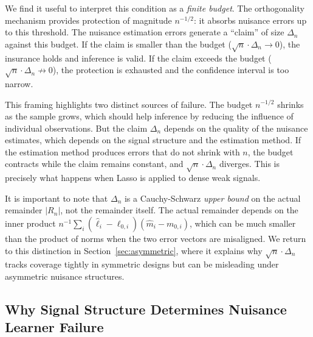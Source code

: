 \documentclass[a4paper,10.5pt]{article}
\begin{document}
We find it useful to interpret this condition as a \emph{finite budget}. The orthogonality mechanism provides protection of magnitude $n^{-1/2}$: it absorbs nuisance errors up to this threshold. The nuisance estimation errors generate a ``claim'' of size $\Delta_n$ against this budget. If the claim is smaller than the budget ($\sqrt{n} \cdot \Delta_n \to 0$), the insurance holds and inference is valid. If the claim exceeds the budget ($\sqrt{n} \cdot \Delta_n \not\to 0$), the protection is exhausted and the confidence interval is too narrow.

This framing highlights two distinct sources of failure. The budget $n^{-1/2}$ shrinks as the sample grows, which should help inference by reducing the influence of individual observations. But the claim $\Delta_n$ depends on the quality of the nuisance estimates, which depends on the signal structure and the estimation method. If the estimation method produces errors that do not shrink with $n$, the budget contracts while the claim remains constant, and $\sqrt{n} \cdot \Delta_n$ diverges. This is precisely what happens when Lasso is applied to dense weak signals.

It is important to note that $\Delta_n$ is a Cauchy-Schwarz \emph{upper bound} on the actual remainder $|R_n|$, not the remainder itself. The actual remainder depends on the inner product $n^{-1}\sum_i (\hat{\ell}_i - \ell_{0,i})(\hat{m}_i - m_{0,i})$, which can be much smaller than the product of norms when the two error vectors are misaligned. We return to this distinction in Section~\ref{sec:asymmetric}, where it explains why $\sqrt{n}\cdot\Delta_n$ tracks coverage tightly in symmetric designs but can be misleading under asymmetric nuisance structures.


\subsection{Why Signal Structure Determines Nuisance Learner Failure}\label{sec:signal_structure}
\end{document}
